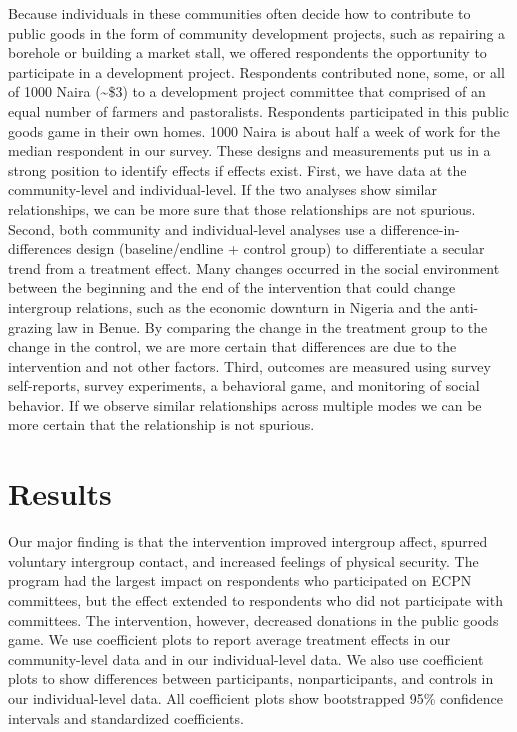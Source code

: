 \documentclass[11pt]{article}
\begin{document}
Because individuals in these communities often decide how to contribute
to public goods in the form of community development projects, such as
repairing a borehole or building a market stall, we offered respondents
the opportunity to participate in a development project. Respondents
contributed none, some, or all of 1000 Naira (\textasciitilde\$3) to a
development project committee that comprised of an equal number of
farmers and pastoralists. Respondents participated in this public goods
game in their own homes. 1000 Naira is about half a week of work for the
median respondent in our survey. These designs and measurements put us
in a strong position to identify effects if effects exist. First, we
have data at the community-level and individual-level. If the two
analyses show similar relationships, we can be more sure that those
relationships are not spurious. Second, both community and
individual-level analyses use a difference-in-differences design
(baseline/endline + control group) to differentiate a secular trend from
a treatment effect. Many changes occurred in the social environment
between the beginning and the end of the intervention that could change
intergroup relations, such as the economic downturn in Nigeria and the
anti-grazing law in Benue. By comparing the change in the treatment
group to the change in the control, we are more certain that differences
are due to the intervention and not other factors. Third, outcomes are
measured using survey self-reports, survey experiments, a behavioral
game, and monitoring of social behavior. If we observe similar
relationships across multiple modes we can be more certain that the
relationship is not spurious.

\hypertarget{results}{%
\section{Results}\label{results}}

Our major finding is that the intervention improved intergroup affect,
spurred voluntary intergroup contact, and increased feelings of physical
security. The program had the largest impact on respondents who
participated on ECPN committees, but the effect extended to respondents
who did not participate with committees. The intervention, however,
decreased donations in the public goods game. We use coefficient plots
to report average treatment effects in our community-level data and in
our individual-level data. We also use coefficient plots to show
differences between participants, nonparticipants, and controls in our
individual-level data. All coefficient plots show bootstrapped 95\%
confidence intervals and standardized coefficients.
\end{document}
